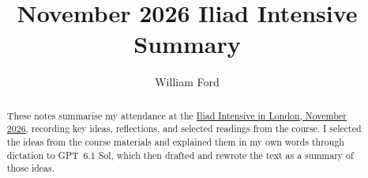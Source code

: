 \documentclass[reqno]{amsart}
\title{November 2026 Iliad Intensive Summary}
\author{William Ford}
\date{}
\begin{document}
\raggedbottom
\begin{abstract}
These notes summarise my attendance at the \href{https://intensive-november.pages.dev/}{Iliad Intensive in London, November 2026}, recording key ideas, reflections, and selected readings from the course.
I selected the ideas from the course materials and explained them in my own words through dictation to GPT~6.1 Sol, which then drafted and rewrote the text as a summary of those ideas.
\end{abstract}
\maketitle



\printbibliography
\end{document}
